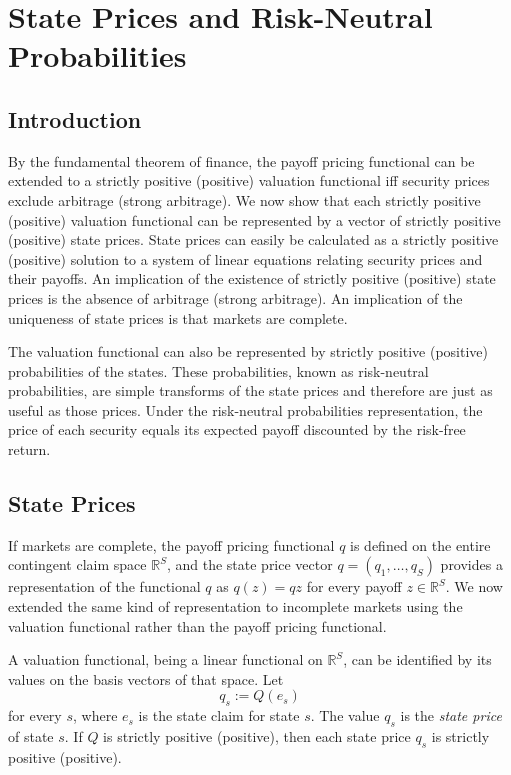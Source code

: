 \documentclass[\topdir/lecture\_notes.tex]{subfiles}
\begin{document}
\section{State Prices and Risk-Neutral Probabilities}
\subsection{Introduction}
By the fundamental theorem of finance, the payoff pricing functional can be extended to a strictly positive (positive) valuation functional iff security prices exclude arbitrage (strong arbitrage). We now show that each strictly positive (positive) valuation functional can be represented by a vector of strictly positive (positive) state prices. State prices can easily be calculated as a strictly positive (positive) solution to a system of linear equations relating security prices and their payoffs. An implication of the existence of strictly positive (positive) state prices is the absence of arbitrage (strong arbitrage). An implication of the uniqueness of state prices is that markets are complete.

The valuation functional can also be represented by strictly positive (positive) probabilities of the states. These probabilities, known as risk-neutral probabilities, are simple transforms of the state prices and therefore are just as useful as those prices. Under the risk-neutral probabilities representation, the price of each security equals its expected payoff discounted by the risk-free return.

\subsection{State Prices}
If markets are complete, the payoff pricing functional \(q\) is defined on the entire contingent claim space \(\mathbb{R}^{S}\), and the state price vector \(q=(q_{1}, \ldots, q_{S})\) provides a representation of the functional \(q\) as \(q(z)=q z\) for every payoff \(z \in \mathbb{R}^{S}\). We now extended the same kind of representation to incomplete markets using the valuation functional rather than the payoff pricing functional.

A valuation functional, being a linear functional on \(\mathbb{R}^{S}\), can be identified by its values on the basis vectors of that space. Let
\begin{equation}
q_{s} := Q(e_{s}) \label{eq:state_price_definition} 
\end{equation}
for every \(s\), where \(e_{s}\) is the state claim for state \(s\). The value \(q_{s}\) is the \emph{state price} of state \(s\). If \(Q\) is strictly positive (positive), then each state price \(q_{s}\) is strictly positive (positive).
\end{document}
